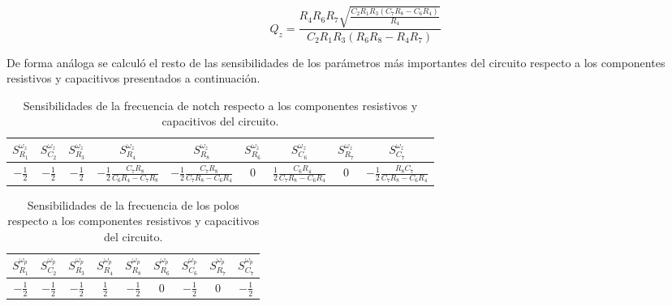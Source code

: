 \begin{equation}
Q_z = \frac{R_4 R_6 R_7 \sqrt{\frac{C_2 R_1 R_3 (C_7 R_8 - C_6 R_4)}{R_4}}}{C_2 R_1 R_3 (R_6 R_8 - R_4 R_7)}
\end{equation}

De forma análoga se calculó el resto de las sensibilidades de los parámetros más importantes del circuito respecto a los componentes resistivos y capacitivos presentados a continuación.

\begin{table}[H]
\centering
\begin{tabular}{@{}ccccccccc@{}}
\toprule
$S^{\omega_z}_{R_1}$ & $S^{\omega_z}_{C_2}$ & $S^{\omega_z}_{R_3}$ & $S^{\omega_z}_{R_4}$ & $S^{\omega_z}_{R_8}$ & $S^{\omega_z}_{R_6}$ & $S^{\omega_z}_{C_6}$ & $S^{\omega_z}_{R_7}$ & $S^{\omega_z}_{C_7}$  \\ \midrule
$-\frac{1}{2}$ & $-\frac{1}{2}$ & $-\frac{1}{2}$ & $-\frac{1}{2} \frac{C_7 R_8}{C_6 R_4 - C_7 R_8}$ & $-\frac{1}{2}\frac{C_7 R_8}{C_7 R_8 - C_6 R_4}$ & $0$ & $\frac{1}{2} \frac{C_6 R_4}{C_7 R_8 - C_6 R_4}$ & $0$ & $-\frac{1}{2} \frac{R_8 C_7}{C_7 R_8 - C_6 R_4}$ \\ \bottomrule
\end{tabular}
\caption{Sensibilidades de la frecuencia de notch respecto a los componentes resistivos y capacitivos del circuito.}
\label{tab:sens_wz}
\end{table}

\begin{table}[H]
\centering
\begin{tabular}{@{}ccccccccc@{}}
\toprule
$S^{\omega_p}_{R_1}$ & $S^{\omega_p}_{C_2}$ & $S^{\omega_p}_{R_3}$ & $S^{\omega_p}_{R_4}$ & $S^{\omega_p}_{R_8}$ & $S^{\omega_p}_{R_6}$ & $S^{\omega_p}_{C_6}$ & $S^{\omega_p}_{R_7}$ & $S^{\omega_p}_{C_7}$  \\ \midrule
$-\frac{1}{2}$ & $-\frac{1}{2}$ & $-\frac{1}{2}$ & $\frac{1}{2}$ & $-\frac{1}{2}$ & $0$ & $-\frac{1}{2}$ & $0$ & $-\frac{1}{2}$ \\ \bottomrule
\end{tabular}
\caption{Sensibilidades de la frecuencia de los polos respecto a los componentes resistivos y capacitivos del circuito.}
\label{tab:sens_wp}
\end{table}

